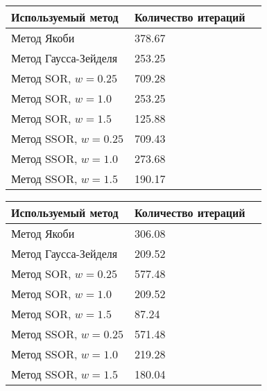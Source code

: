 \begin{figure}[h]
	\begin{center}
   		\begin{tabular}{ | l | l | p{5cm} |}
    	\hline
    	Используемый метод   & Количество итераций  \\ \hline
    	Метод Якоби          & 378.67  \\ \hline
    	Метод Гаусса-Зейделя & 253.25  \\ \hline

   		Метод SOR,  $w=0.25$ & 709.28  \\ \hline
    	Метод SOR,  $w=1.0$  & 253.25  \\ \hline
    	Метод SOR,  $w=1.5$  & 125.88  \\ \hline

    	Метод SSOR, $w=0.25$ & 709.43  \\ \hline
    	Метод SSOR, $w=1.0$  & 273.68  \\ \hline
    	Метод SSOR, $w=1.5$  & 190.17  \\ \hline

    	\end{tabular}
	\end{center}
\end{figure}

\begin{figure}[h]
	\begin{center}
   		\begin{tabular}{ | l | l | p{5cm} |}
    	\hline
    	Используемый метод   & Количество итераций  \\ \hline
    	Метод Якоби          & 306.08  \\ \hline
    	Метод Гаусса-Зейделя & 209.52  \\ \hline

   		Метод SOR,  $w=0.25$ & 577.48  \\ \hline
    	Метод SOR,  $w=1.0$  & 209.52  \\ \hline
    	Метод SOR,  $w=1.5$  & 87.24   \\ \hline

    	Метод SSOR, $w=0.25$ & 571.48  \\ \hline
    	Метод SSOR, $w=1.0$  & 219.28  \\ \hline
    	Метод SSOR, $w=1.5$  & 180.04  \\ \hline

    	\end{tabular}
	\end{center}
\end{figure}




